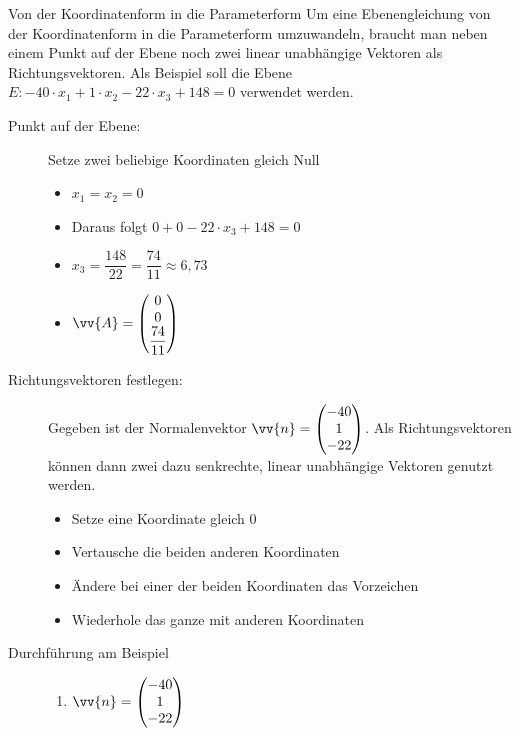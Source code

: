 \begin{merke}{Von der Koordinatenform in die Parameterform}{}
    Um eine Ebenengleichung von der Koordinatenform in die Parameterform umzuwandeln, braucht man neben einem Punkt auf der Ebene noch zwei linear unabhängige Vektoren als Richtungsvektoren. Als Beispiel soll die Ebene\\ \(E: -40\cdot x_1 + 1\cdot x_2 -22\cdot x_3 +148=0\) verwendet werden.
    \begin{description}
        \item[Punkt auf der Ebene:]  Setze zwei beliebige Koordinaten gleich Null
        \begin{itemize}
            \item \(x_1 = x_2 =0\)
            \item Daraus folgt \(0+0-22\cdot x_3 +148 = 0\)
            \item \(x_3 = \dfrac{148}{22} = \dfrac{74}{11}\approx 6,73\)
            \item \(\vv{A} = \begin{pmatrix}
                0\\0\\\dfrac{74}{11}
            \end{pmatrix}\)
        \end{itemize}
        \item[Richtungsvektoren festlegen:] Gegeben ist der Normalenvektor \(\vv{n} = \begin{pmatrix}
          -40\\1\\-22\end{pmatrix}\). Als Richtungsvektoren können dann zwei dazu senkrechte, linear unabhängige Vektoren genutzt werden. 
        \begin{itemize}
            \item Setze eine Koordinate gleich 0 
            \item Vertausche die beiden anderen Koordinaten
            \item Ändere bei einer der beiden Koordinaten das Vorzeichen
            \item  Wiederhole das ganze mit anderen Koordinaten
        \end{itemize}
        \item[Durchführung am Beispiel] 
        \begin{enumerate}
            \item \(\vv{n} = \begin{pmatrix}
          -40\\1\\-22\end{pmatrix}\)

\end{enumerate}
\end{description}
\end{merke}
